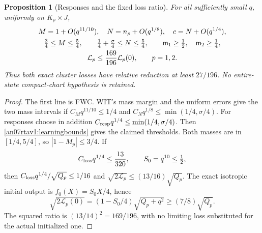 \documentclass[11pt]{article}
\numberwithin{equation}{section}
\newtheorem{proposition}[theorem]{Proposition}
\begin{document}
\begin{proposition}[Responses and the fixed loss ratio]
\label{an07rtav1:learning}
For all sufficiently small \(q\), uniformly on \(K_\rho\times J\),
\begin{gather}
 M=1+O(q^{11/10}),\quad N=n_\rho+O(q^{1/8}),\quad
 c=N+O(q^{1/4}),\notag\\
 \tfrac34\le M\le\tfrac54,\qquad
 \tfrac14+\tfrac\sigma4\le N\le\tfrac54,\qquad
 \mathsf m_1\ge\tfrac12,\quad\mathsf m_2\ge\tfrac14,
 \label{an07rtav1:learningresponse}\\
 \mathcal L_p\le\frac{169}{196}\mathcal L_p(0),
                    \qquad p=1,2.
 \label{an07rtav1:lossratio}
\end{gather}
Thus both exact cluster losses have relative reduction at least
\(27/196\). No entire-state compact-chart hypothesis is retained.
\end{proposition}
\begin{proof}
The first line is FWC. WIT's mass margin and the uniform errors
give the two mass intervals if
\(C_Mq^{11/10}\le1/4\) and
\(C_Nq^{1/8}\le\min(1/4,\sigma/4)\).
For responses choose in addition
\(C_{\rm resp}q^{1/4}\le\min(1/4,\sigma/4)\).
Then \eqref{an07rtav1:learningbounds} gives the claimed thresholds.
Both masses are in \([1/4,5/4]\), so \(|1-M_p|\le3/4\).
If
\begin{equation}
 C_{\rm loss}q^{1/4}\le\frac{13}{320},
 \qquad S_0=q^{10}\le\tfrac12,
 \label{an07rtav1:learnthreshold}
\end{equation}
then \(C_{\rm loss}q^{1/4}/\sqrt{Q_p}\le1/16\) and
\(\sqrt{2\mathcal L_p}\le(13/16)\sqrt{Q_p}\).
The exact isotropic initial output is \(f_0(X)=S_0X/4\), hence
\[
 \sqrt{2\mathcal L_p(0)}
 =(1-S_0/4)\sqrt{Q_p+q^2}\ge(7/8)\sqrt{Q_p}.
\]
The squared ratio is \((13/14)^2=169/196\), with no limiting
loss substituted for the actual initialized one.
\end{proof}
\end{document}
